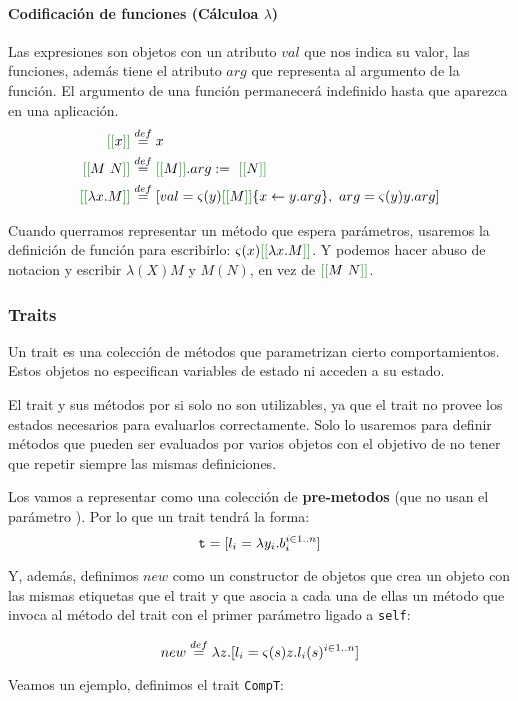 \paragraph{Codificación de funciones (Cálculoa $\lambda$)}
Las expresiones son objetos con un atributo $val$ que nos indica su valor, las funciones, además tiene el atributo $arg$ que representa al argumento de la función. El argumento de una función permanecerá indefinido hasta que aparezca en una aplicación.
\begin{align*}
\OORep{x} &\equalDef x\\
\OORep{M~N} &\equalDef \OORep{M}.arg :=~\OORep{N}\\
\OORep{\lambdaAbsI{x}{M}} &\equalDef 
[\OOAtributo{val}{y}{\OORep{M}\{x\leftarrow y.arg\}},~\OOAtributo{arg}{y}{y.arg}]\\
\end{align*}

Cuando querramos representar un método que espera parámetros, usaremos la definición de función para escribirlo: $\varsigma(x)\OORep {\lambdaAbsI{x}{M}}$. Y podemos hacer abuso de notacion y escribir $\lambda(X)M$ y $M(N)$, en vez de $\OORep{M~N}$.

\subsubsection{Traits}
Un trait es una colección de métodos que parametrizan cierto comportamientos. Estos objetos no especifican variables de estado ni acceden a su estado.

El trait y sus métodos por si solo no son utilizables, ya que el trait no provee los estados necesarios para evaluarlos correctamente. Solo lo usaremos para definir métodos que pueden ser evaluados por varios objetos con el objetivo de no tener que repetir siempre las mismas definiciones.

Los vamos a representar como una colección de \textbf{pre-metodos} (que no usan el parámetro ). Por lo que un trait tendrá la forma:
$$\texttt{t} = [l_i = \lambda y_i. b_i^{i\in 1..n}]$$

Y, además, definimos $new$ como un constructor de objetos que crea un objeto con las mismas etiquetas que el trait y que asocia a cada una de ellas un método que invoca al método del trait con el primer parámetro ligado a \texttt{self}:

$$new \overset{def}{=} \lambda z. [l_i = \varsigma(s)z.l_i(s)^{i\in 1..n}]$$

Veamos un ejemplo, definimos el trait \texttt{CompT}:

